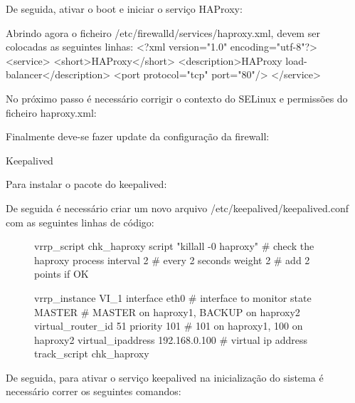 De seguida, ativar o boot e iniciar o serviço HAProxy:
 \par
{} \par
{} \par

Abrindo agora o ficheiro /etc/firewalld/services/haproxy.xml, devem ser colocadas as seguintes linhas:
<?xml version="1.0" encoding="utf-8"?>
<service>
<short>HAProxy</short>
<description>HAProxy load-balancer</description>
<port protocol="tcp" port="80"/>
</service>

No próximo passo é necessário corrigir o contexto do SELinux e permissões do ficheiro haproxy.xml:
 \par
{} \par
{} \par

Finalmente deve-se fazer update da configuração da firewall:
 \par
{} \par

Keepalived

Para instalar o pacote do keepalived:
 \par

De seguida é necessário criar um novo arquivo /etc/keepalived/keepalived.conf com as seguintes linhas de código:

\begin{figure}[!h]
\begin{MyVerbatim}
vrrp_script chk_haproxy {
  script "killall -0 haproxy" # check the haproxy process
  interval 2 # every 2 seconds
  weight 2 # add 2 points if OK
}

vrrp_instance VI_1 {
  interface eth0 # interface to monitor
  state MASTER # MASTER on haproxy1, BACKUP on haproxy2
  virtual_router_id 51
  priority 101 # 101 on haproxy1, 100 on haproxy2
  virtual_ipaddress {
    192.168.0.100 # virtual ip address 
  }
  track_script {
    chk_haproxy
  }
}
\end{MyVerbatim}
\end{figure}


De seguida, para ativar o serviço keepalived na inicialização do sistema é necessário correr os seguintes comandos:
 \par
{} \par

